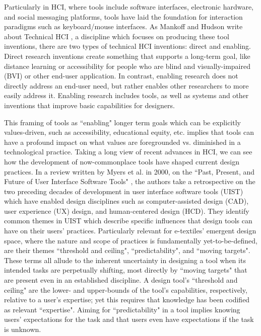 Particularly in HCI, where tools include software interfaces, electronic hardware, and social messaging platforms, tools have laid the foundation for interaction paradigms such as keyboard/mouse interfaces. As Mankoff and Hudson write about Technical HCI , a discipline which focuses on producing these tool inventions, there are two types of technical HCI inventions: direct and enabling. Direct research inventions create something that supports a long-term goal, like distance learning or accessibility for people who are blind and visually-impaired (BVI) or other end-user application. In contrast, enabling research does not directly address an end-user need, but rather enables other researchers to more easily address it. Enabling research includes tools, as well as systems and other inventions that improve basic capabilities for designers.

This framing of tools as ``enabling" longer term goals which can be explicitly values-driven, such as accessibility, educational equity, etc. implies that tools can have a profound impact on what values are foregrounded vs. diminished in a technological practice. Taking a long view of recent advances in HCI, we can see how the development of now-commonplace tools have shaped current design practices. In a review written by Myers et al. in 2000, on the ``Past, Present, and Future of User Interface Software Tools" \cite{myers_past_2000}, the authors take a retrospective on the two preceding decades of development in user interface software tools (UIST) which have enabled design disciplines such as computer-assisted design (CAD), user experience (UX) design, and human-centered design (HCD). They identify common themes in UIST which describe specific influences that design tools can have on their users' practices. Particularly relevant for e-textiles' emergent design space, where the nature and scope of practices is fundamentally yet-to-be-defined, are their themes ``threshold and ceiling", ``predictability", and ``moving targets". These terms all allude to the inherent uncertainty in designing a tool when its intended tasks are perpetually shifting, most directly by ``moving targets" that are present even in an established discipline. A design tool's ``threshold and ceiling" are the lower- and upper-bounds of the tool's capabilities, respectively, relative to a user's expertise; yet this requires that knowledge has been codified as relevant ``expertise". Aiming for ``predictability" in a tool implies knowing users' expectations for the task and that users even have expectations if the task is unknown. 

